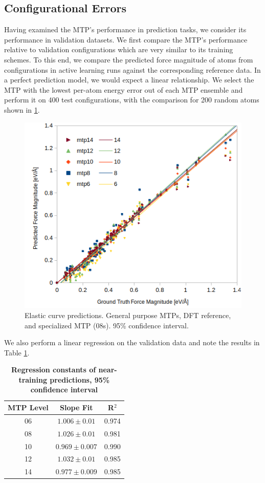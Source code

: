 \documentclass[9pt,twocolumn,twoside]{opticajnl}
\begin{document}
\subsection{Configurational Errors}
Having examined the MTP's performance in prediction tasks, we consider its performance in validation datasets. We first compare the MTP's performance relative to validation configurations which are very similar to its training schemes. To this end, we compare the predicted force magnitude of atoms from configurations in active learning runs against the corresponding reference data. In a perfect prediction model, we would expect a linear relationship. We select the MTP with the lowest per-atom energy error out of each MTP ensemble and perform it on 400 test configurations, with the comparison for 200 random atoms shown in \ref{fig:configs}.

\begin{figure}[ht]
  \centering
  \includegraphics[width=\linewidth]{assets/configurations.png}
  \caption{Elastic curve predictions. General purpose MTPs, DFT reference, and specialized MTP (08s). 95\% confidence interval.}
  \label{fig:configs}
\end{figure}

We also perform a linear regression on the validation data and note the results in Table \ref{tab:configs}.

\begin{table}[htbp]
  \centering
  \caption{\bf Regression constants of near-training predictions, 95\% confidence interval }
  \begin{tabular}{ccc}
  \hline
  MTP Level & Slope Fit &  R$^2$\\ 
  \hline
  06 & $1.006 \pm 0.01$ & 0.974 \\
  08 & $1.026 \pm 0.01$ & 0.981  \\
  10 & $0.969 \pm 0.007$ & 0.990 \\
  12 & $1.032 \pm 0.01$ & 0.985 \\
  14 & $0.977 \pm 0.009$ & 0.985 \\
  \hline
  \end{tabular}
  \label{tab:configs}
\end{table}
\end{document}

